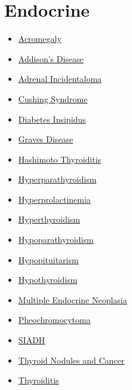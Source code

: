 \section*{Endocrine}
\label{sec:organ_endocrine}
\begin{itemize}[noitemsep]
  \item \hyperlink{sec:Acromegaly}{Acromegaly}
  \item \hyperlink{sec:Addison's Disease}{Addison's Disease}
  \item \hyperlink{sec:Adrenal Incidentaloma}{Adrenal Incidentaloma}
  \item \hyperlink{sec:Cushing Syndrome}{Cushing Syndrome}
  \item \hyperlink{sec:Diabetes Insipidus}{Diabetes Insipidus}
  \item \hyperlink{sec:Graves Disease}{Graves Disease}
  \item \hyperlink{sec:Hashimoto Thyroiditis}{Hashimoto Thyroiditis}
  \item \hyperlink{sec:Hyperparathyroidism}{Hyperparathyroidism}
  \item \hyperlink{sec:Hyperprolactinemia}{Hyperprolactinemia}
  \item \hyperlink{sec:Hyperthyroidism}{Hyperthyroidism}
  \item \hyperlink{sec:Hypoparathyroidism}{Hypoparathyroidism}
  \item \hyperlink{sec:Hypopituitarism}{Hypopituitarism}
  \item \hyperlink{sec:Hypothyroidism}{Hypothyroidism}
  \item \hyperlink{sec:Multiple Endocrine Neoplasia}{Multiple Endocrine Neoplasia}
  \item \hyperlink{sec:Pheochromocytoma}{Pheochromocytoma}
  \item \hyperlink{sec:SIADH}{SIADH}
  \item \hyperlink{sec:Thyroid Nodules and Cancer}{Thyroid Nodules and Cancer}
  \item \hyperlink{sec:Thyroiditis}{Thyroiditis}
\end{itemize}

